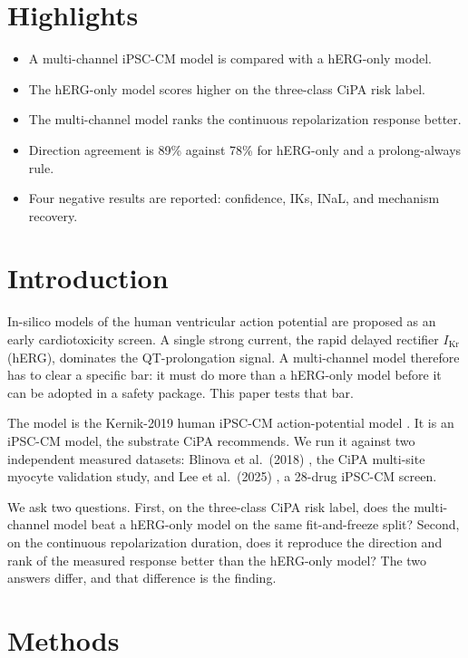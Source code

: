 \documentclass[preprint,12pt]{elsarticle}
\begin{document}
\section*{Highlights}
\begin{itemize}
\item A multi-channel iPSC-CM model is compared with a hERG-only model.
\item The hERG-only model scores higher on the three-class CiPA risk label.
\item The multi-channel model ranks the continuous repolarization response better.
\item Direction agreement is 89\% against 78\% for hERG-only and a prolong-always rule.
\item Four negative results are reported: confidence, IKs, INaL, and mechanism recovery.
\end{itemize}

\section{Introduction}\label{sec:intro}

In-silico models of the human ventricular action potential are proposed as an early
cardiotoxicity screen. A single strong current, the rapid delayed rectifier
$I_{\mathrm{Kr}}$ (hERG), dominates the QT-prolongation signal. A multi-channel model
therefore has to clear a specific bar: it must do more than a hERG-only model before it can be adopted in a safety package. This paper tests
that bar.

The model is the Kernik-2019 human iPSC-CM action-potential model \cite{kernik2019}.
It is an iPSC-CM model, the substrate CiPA recommends. We run it against two
independent measured datasets: Blinova et al.\ (2018) \cite{blinova2018}, the CiPA
multi-site myocyte validation study, and Lee et al.\ (2025) \cite{lee2025}, a 28-drug
iPSC-CM screen.

We ask two questions. First, on the three-class CiPA risk label, does the multi-channel
model beat a hERG-only model on the same fit-and-freeze split?
Second, on the continuous repolarization duration, does it reproduce the direction and
rank of the measured response better than the hERG-only model? The two answers differ, and that
difference is the finding.

\section{Methods}\label{sec:methods}
\end{document}
